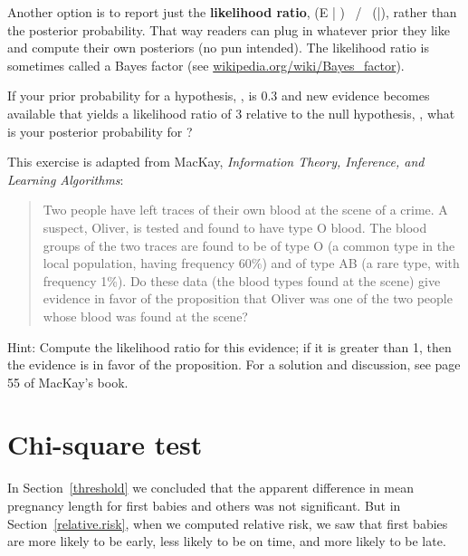 \documentclass[12pt]{book}
\begin{document}
Another option is to report just the {\bf likelihood ratio}, \Prob(E
| \HH{}) ~/~ \Prob(\E|\HH{}), rather than the
posterior probability.  That way readers can plug in whatever prior
they like and compute their own posteriors (no pun intended).  The
likelihood ratio is sometimes called a Bayes factor (see
\url{wikipedia.org/wiki/Bayes_factor}).

\begin{exercise}
If your prior probability for a hypothesis, \HH{}, is 0.3 and new
evidence becomes available that yields a likelihood ratio of 3
relative to the null hypothesis, \HH{}, what is your posterior
probability for \HH{}?


\end{exercise}


\begin{exercise}
This exercise is adapted from MacKay, {\em Information
  Theory, Inference, and Learning Algorithms}:

\begin{quote}

Two people have left traces of their own blood at the scene of a
crime.  A suspect, Oliver, is tested and found to have type O blood.
The blood groups of the two traces are found to be of type O (a common
type in the local population, having frequency 60\%) and of type AB (a
rare type, with frequency 1\%).  Do these data (the blood types found
at the scene) give evidence in favor of the proposition that
Oliver was one of the two people whose blood was found at the scene?

\end{quote}

Hint: Compute the likelihood ratio for this evidence; if it is greater
than 1, then the evidence is in favor of the proposition.
For a solution and discussion, see page 55 of MacKay's book.

\end{exercise}


\section{Chi-square test}

In Section~\ref{threshold} we concluded that the apparent difference
in mean pregnancy length for first babies and others was not
significant.  But in Section~\ref{relative.risk}, when we computed
relative risk, we saw that first babies are more likely to be early,
less likely to be on time, and more likely to be late.
\end{document}

